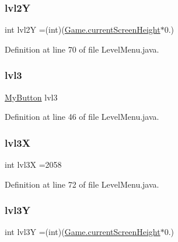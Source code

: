 \subsubsection{\texorpdfstring{lvl2Y}{lvl2Y}}
{\footnotesize\ttfamily int lvl2Y =(int)(\hyperlink{classprogetto_1_1_game_a1aca3161d2e02e5dc13bb3cae83a8ad1}{Game.\+current\+Screen\+Height}$\ast$0.)\hspace{0.3cm}{\ttfamily [private]}}



Definition at line 70 of file Level\+Menu.\+java.

\mbox{\label{classui_1_1_level_menu_aa528df3e872324e8ce0c3cd82930113b}} 
\subsubsection{\texorpdfstring{lvl3}{lvl3}}
{\footnotesize\ttfamily \hyperlink{classui_1_1_my_button}{My\+Button} lvl3\hspace{0.3cm}{\ttfamily [private]}}



Definition at line 46 of file Level\+Menu.\+java.

\mbox{\label{classui_1_1_level_menu_acfc9117f336907e6204ab7e7abfc9ba8}} 
\subsubsection{\texorpdfstring{lvl3X}{lvl3X}}
{\footnotesize\ttfamily int lvl3X =2058\hspace{0.3cm}{\ttfamily [private]}}



Definition at line 72 of file Level\+Menu.\+java.

\mbox{\label{classui_1_1_level_menu_a996daa7186e7d5e32600f8634d605bbc}} 
\subsubsection{\texorpdfstring{lvl3Y}{lvl3Y}}
{\footnotesize\ttfamily int lvl3Y =(int)(\hyperlink{classprogetto_1_1_game_a1aca3161d2e02e5dc13bb3cae83a8ad1}{Game.\+current\+Screen\+Height}$\ast$0.)\hspace{0.3cm}{\ttfamily [private]}}



